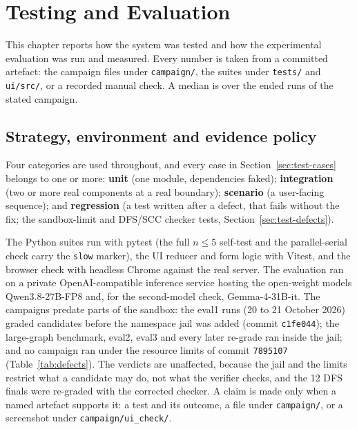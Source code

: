 \chapter{Testing and Evaluation}
\label{ch:testing}

This chapter reports how the system was tested and how the experimental
evaluation was run and measured. Every number is taken from a committed
artefact: the campaign files under \texttt{campaign/}, the suites under
\texttt{tests/} and \texttt{ui/src/}, or a recorded manual check. A median is
over the ended runs of the stated campaign.

\section{Strategy, environment and evidence policy}
\label{sec:test-strategy}

Four categories are used throughout, and every case in
Section~\ref{sec:test-cases} belongs to one or more: \textbf{unit} (one module,
dependencies faked); \textbf{integration} (two or more real components at a
real boundary); \textbf{scenario} (a user-facing sequence); and
\textbf{regression} (a test written after a defect, that fails without the
fix; the sandbox-limit and DFS/SCC checker tests,
Section~\ref{sec:test-defects}).

The Python suites run with pytest (the full $n \le 5$ self-test and the
parallel-serial check carry the \texttt{slow} marker), the UI reducer and form
logic with Vitest, and the browser check with headless Chrome against the real
server. The evaluation ran on a private OpenAI-compatible inference service
hosting the open-weight models Qwen3.8-27B-FP8 and, for the second-model check,
Gemma-4-31B-it. The campaigns predate parts of the
sandbox: the eval1 runs (20 to 21 October 2026) graded candidates before the
namespace jail was added (commit \texttt{c1fe044}); the large-graph benchmark,
eval2, eval3 and every later re-grade ran inside the jail; and no campaign ran
under the resource limits of commit \texttt{7895107} (Table~\ref{tab:defects}).
The verdicts are unaffected, because the jail and the limits restrict what a
candidate may do, not what the verifier checks, and the 12 DFS finals were
re-graded with the corrected checker. A claim is made
only when a named artefact supports it: a test and its outcome, a file under
\texttt{campaign/}, or a screenshot under \texttt{campaign/ui\_check/}.

